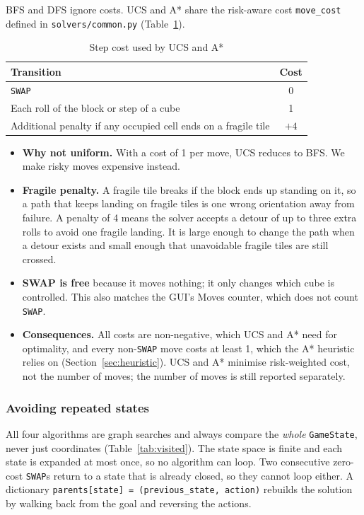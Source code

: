 BFS and DFS ignore costs. UCS and A* share the risk-aware cost \texttt{move\_cost} defined in
\texttt{solvers/common.py} (Table~\ref{tab:cost}).

\begin{table}[H]
\centering
\caption{Step cost used by UCS and A*}
\label{tab:cost}
\begin{tabular}{lc}
\toprule
\textbf{Transition} & \textbf{Cost} \\
\midrule
\texttt{SWAP} & 0 \\
Each roll of the block or step of a cube & 1 \\
Additional penalty if any occupied cell ends on a fragile tile & $+4$ \\
\bottomrule
\end{tabular}
\end{table}

\begin{itemize}[leftmargin=*]
\item \textbf{Why not uniform.} With a cost of 1 per move, UCS reduces to BFS. We make risky
moves expensive instead.
\item \textbf{Fragile penalty.} A fragile tile breaks if the block ends up standing on it, so a
path that keeps landing on fragile tiles is one wrong orientation away from failure. A penalty of
4 means the solver accepts a detour of up to three extra rolls to avoid one fragile landing. It is
large enough to change the path when a detour exists and small enough that unavoidable fragile
tiles are still crossed.
\item \textbf{SWAP is free} because it moves nothing; it only changes which cube is controlled.
This also matches the GUI's Moves counter, which does not count \texttt{SWAP}.
\item \textbf{Consequences.} All costs are non-negative, which UCS and A* need for optimality,
and every non-\texttt{SWAP} move costs at least 1, which the A* heuristic relies on
(Section~\ref{sec:heuristic}). UCS and A* minimise risk-weighted cost, not the number of moves;
the number of moves is still reported separately.
\end{itemize}

\subsubsection{Avoiding repeated states}

All four algorithms are graph searches and always compare the \emph{whole} \texttt{GameState},
never just coordinates (Table~\ref{tab:visited}). The state space is finite and each state is
expanded at most once, so no algorithm can loop. Two consecutive zero-cost \texttt{SWAP}s return
to a state that is already closed, so they cannot loop either. A dictionary
\texttt{parents[state] = (previous\_state, action)} rebuilds the solution by walking back from the
goal and reversing the actions.

